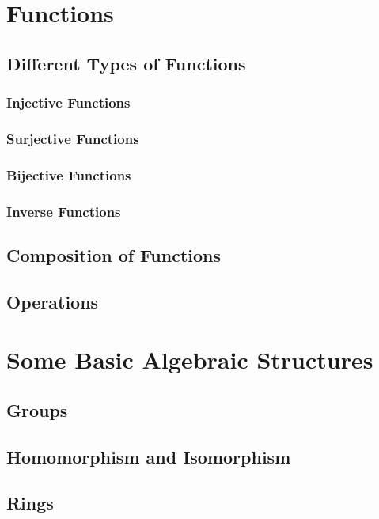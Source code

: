 \section{Functions}
\subsection{Different Types of Functions}
\subsubsection{Injective Functions}
\subsubsection{Surjective Functions}
\subsubsection{Bijective Functions}
\subsubsection{Inverse Functions}
\subsection{Composition of Functions}
\subsection{Operations}
\section{Some Basic Algebraic Structures}
\subsection{Groups}
\subsection{Homomorphism and Isomorphism}
\subsection{Rings}
